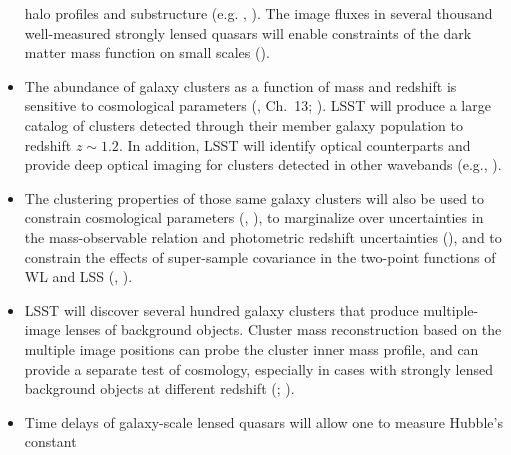 \begin{itemize}
halo profiles and substructure (e.g. \cite{Mandelbaum2006}, \cite{Vegetti2012}). The image fluxes in several thousand well-measured
strongly lensed quasars will enable constraints of the dark matter mass function on small scales (\cite{Dalal2002}).
\item The abundance of galaxy clusters as a function of mass and redshift is sensitive to cosmological parameters
(\cite{SciBook}, Ch.~13; \cite{vonderLinden2014}). LSST will produce a large catalog of clusters detected through their member galaxy population
to redshift $z\sim 1.2$.  In addition, LSST will identify optical counterparts and provide deep optical
imaging for clusters detected in other wavebands (e.g., \cite{Staniszewski2009}).
\item The clustering properties of those same galaxy clusters will also be used to constrain
  cosmological parameters (\cite{Mo1996}, \cite{Mana2013}), to marginalize over uncertainties in
  the mass-observable relation and photometric redshift uncertainties (\cite{Oguri2011}), and to constrain the effects of super-sample covariance in the two-point functions of WL and LSS (\cite{Hu2002}, \cite{Takada2014}).
\item LSST will discover several hundred galaxy clusters that produce multiple-image lenses of background objects.
Cluster mass reconstruction based on the multiple image positions
 can probe the cluster inner mass profile, and can provide a separate test of cosmology, especially
in cases with strongly lensed background objects at different redshift (\cite{Porciani2000}; \cite{Oguri2003}).
\item Time delays of galaxy-scale lensed quasars will allow one to measure Hubble's constant

\end{itemize}
